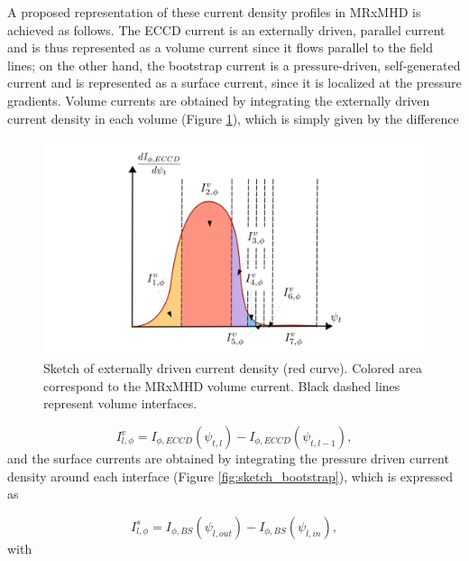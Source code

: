 \documentclass[my_thesis.tex]{subfiles}
\begin{document}
A proposed representation of these current density profiles in \ac{MRxMHD} is achieved as follows. The \ac{ECCD} current is an externally driven, parallel current and is thus represented as a volume current since it flows parallel to the field lines; on the other hand, the bootstrap current is a pressure-driven, self-generated current and is represented as a surface current, since it is localized at the pressure gradients. Volume currents are obtained by integrating the externally driven current density in each volume (Figure \ref{fig:sketch_eccd}), which is simply given by the difference

\begin{figure}
    \centering
    \includegraphics[width=\linewidth]{main/Figures_CurrentConstraint/ABaillod_fig3.pdf}
    \caption{Sketch of externally driven current density (red curve). Colored area correspond to the \ac{MRxMHD} volume current. Black dashed lines represent volume interfaces.}
    \label{fig:sketch_eccd}
\end{figure}


\begin{equation}
    I^v_{l,\phi} = I_{\phi,ECCD}(\psi_{t,l}) - I_{\phi,ECCD}(\psi_{t,l-1}), \label{eq.rep_volume_current}
\end{equation}
and the surface currents are obtained by integrating the pressure driven current density around each interface (Figure \ref{fig:sketch_bootstrap}), which is expressed as

\begin{equation}
    I^s_{l,\phi} = I_{\phi,BS}(\psi_{l,out}) - I_{\phi,BS}(\psi_{l,in}), \label{eq.rep_surface_current}
\end{equation}
with
\end{document}
